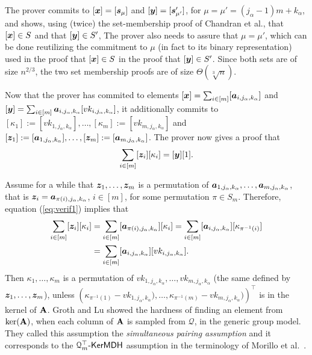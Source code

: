 The prover commits to $[{\boldsymbol{x}}]=[{\boldsymbol{s}}_\mu]$ and $[{\boldsymbol{y}}]=[{\boldsymbol{s}}'_{\mu'}]$, for $\mu=\mu'=(j_\alpha-1)m+k_\alpha$, and shows, using (twice) the set-membership proof of Chandran et al., that $[{\boldsymbol{x}}]\in S$ and that $[{\boldsymbol{y}}]\in S'$, 
The prover also needs to assure that $\mu=\mu'$, which can be done reutilizing the commitment to $\mu$ (in fact to its binary representation) used in the proof that $[{\boldsymbol{x}}]\in S$ in the proof that $[{\boldsymbol{y}}]\in S'$. Since both sets are of size $n^{2/3}$, the two set membership proofs are of size $\Theta(\sqrt[3]{n})$.
 
Now that the prover has commited to elements $[{\boldsymbol{x}}]=\sum_{i\in[m]}[{\boldsymbol{a}}_{i,j_\alpha,k_\alpha}]$ and $[{\boldsymbol{y}}]=\sum_{i\in[m]}{\boldsymbol{a}}_{i,j_\alpha,k_\alpha}[vk_{i,j_\alpha,k_\alpha}]$, it additionally commits to $[\kappa_1]:=[vk_{1,j_\alpha,k_\alpha}],\allowbreak\ldots,\allowbreak[\kappa_m]:=[vk_{m,j_\alpha,k_\alpha}]$ and $[{\boldsymbol{z}}_1]:=[{\boldsymbol{a}}_{1,j_\alpha,k_\alpha}],\ldots,[{\boldsymbol{z}}_m]:=[{\boldsymbol{a}}_{m,j_\alpha,k_\alpha}]$. The prover now gives a proof that
\begin{equation}
\sum_{i\in[m]}[{\boldsymbol{z}}_i][\kappa_i]=[{\boldsymbol{y}}][1]. \label{eq:verif1}
\end{equation}

Assume for a while that ${\boldsymbol{z}}_1,\ldots,{\boldsymbol{z}}_m$ is a permutation of ${\boldsymbol{a}}_{1,j_\alpha,k_\alpha},\ldots,{\boldsymbol{a}}_{m,j_\alpha,k_\alpha}$, that is ${\boldsymbol{z}}_i={\boldsymbol{a}}_{\pi(i),j_\alpha,k_\alpha}$, $i\in[m]$, for some permutation $\pi\in S_m$. Therefore, equation (\ref{eq:verif1}) implies that
\begin{align*}
\sum_{i\in[m]}[{\boldsymbol{z}}_i][\kappa_i]&=\sum_{i\in[m]}[{\boldsymbol{a}}_{\pi(i),j_\alpha,k_\alpha}][\kappa_i]=\sum_{i\in[m]}[{\boldsymbol{a}}_{i,j_\alpha,k_\alpha}][\kappa_{\pi^{-1}(i)}]\\
&=\sum_{i\in[m]}[{\boldsymbol{a}}_{i,j_\alpha,k_\alpha}][vk_{i,j_\alpha,k_\alpha}].
\end{align*}
Then $\kappa_1,\ldots,\kappa_m$ is a permutation of $vk_{1,j_\alpha,k_\alpha},\ldots,vk_{m,j_\alpha,k_\alpha}$ (the same defined by ${\boldsymbol{z}}_1,\ldots,{\boldsymbol{z}}_m$), unless $(\kappa_{\pi^{-1}(1)}-{vk_{1,j_\alpha,k_\alpha}),\ldots,\kappa_{\pi^{-1}(m)}-vk_{m,j_\alpha,k_\alpha})})^\top$ is in the kernel of $\mathbf{{A}}$. Groth and Lu showed the hardness of finding an element from $\ker(\mathbf{{A}})$, when each column of $\mathbf{{A}}$ is sampled from $\mathcal{Q}$, in the generic group model. They called this assumption the \emph{simultaneous pairing assumption} and it corresponds to the $\mathcal{Q}_m^\top\mbox{-}\mathsf{KerMDH}$ assumption in the terminology of Morillo et al.~\cite{AC:MorRafVil16}.

